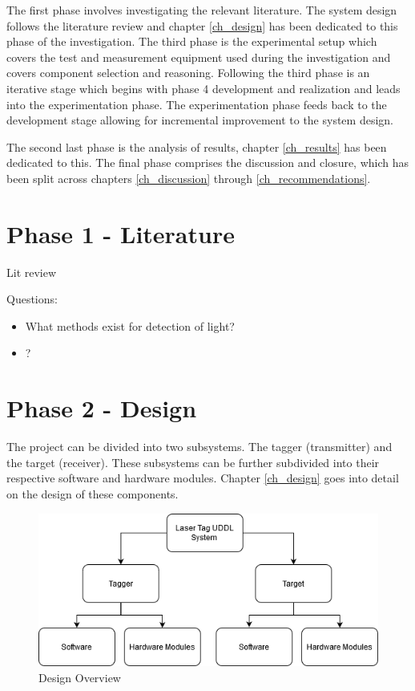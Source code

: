 The first phase involves investigating the relevant literature. The system design follows the literature review and chapter \ref{ch_design} has been dedicated to this phase of the investigation. The third phase is the experimental setup which covers the test and measurement equipment used during the investigation and covers component selection and reasoning. Following the third phase is an iterative stage which begins with phase 4 development and realization and leads into the experimentation phase. The experimentation phase feeds back to the development stage allowing for incremental improvement to the system design.

The second last phase is the analysis of results, chapter \ref{ch_results} has been dedicated to this. The final phase comprises the discussion and closure, which has been split across chapters \ref{ch_discussion} through \ref{ch_recommendations}.


\section{Phase 1 - Literature}

Lit review

Questions:

\begin{itemize}
	\item What methods exist for detection of light?
	\item ?
\end{itemize}



\section{Phase 2 - Design}

The project can be divided into two subsystems. The tagger (transmitter) and the target (receiver). These subsystems can be further subdivided into their respective software and hardware modules. Chapter \ref{ch_design} goes into detail on the design of these components.

\begin{figure}[H]
	\centering
	\includegraphics[width=0.7\linewidth]{figures/methodology/design_overview}
	\caption{Design Overview}
	\label{fig:designoverview}
\end{figure}

